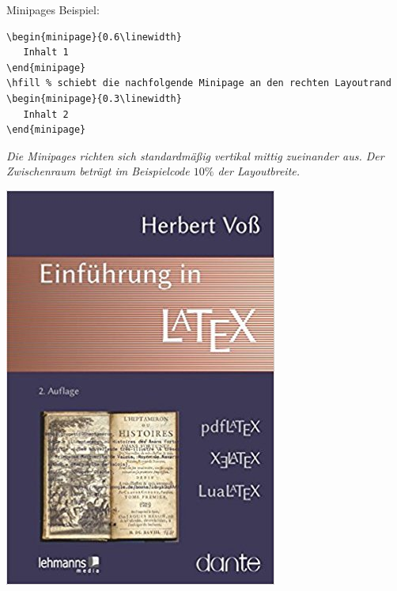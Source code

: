 \begin{frame}[fragile]{Minipages}
Beispiel:
\begin{lstlisting}[style=tex]
\begin{minipage}{0.6\linewidth}
   Inhalt 1
\end{minipage}
\hfill % schiebt die nachfolgende Minipage an den rechten Layoutrand
\begin{minipage}{0.3\linewidth}
   Inhalt 2
\end{minipage}
\end{lstlisting}

\begin{minipage}{0.7\linewidth}
\itshape Die Minipages richten sich standardmä{\ss}ig vertikal mittig zueinander aus. Der Zwischenraum beträgt im Beispielcode $10\%$ der Layoutbreite.
\end{minipage}
\hfill 
\begin{minipage}{0.25\linewidth}
   \includegraphics[width=\linewidth]{img/intro}
\end{minipage}
\end{frame}
